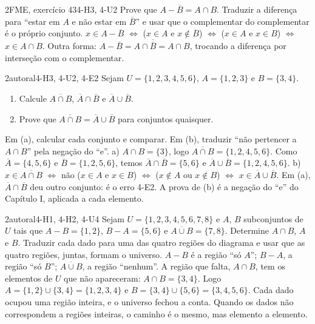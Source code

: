\begin{exemplo}{}{2}{FME, exercício 43}{4-H3, 4-U2}
\label{ex:u4:fme43}
Prove que $A-\overline{B}=A\cap B$.
\plano Traduzir a diferença para \enquote{estar em $A$ e não estar em $\overline{B}$} e usar que o complementar do complementar é o próprio conjunto.
\resolucao $x\in A-\overline{B}$ $\iff$ ($x\in A$ e $x\notin\overline{B}$) $\iff$ ($x\in A$ e $x\in B$) $\iff$ $x\in A\cap B$.
\comentario Outra forma: $A-\overline{B}=A\cap\overline{\overline{B}}=A\cap B$, trocando a diferença por interseção com o complementar.
\end{exemplo}

\begin{exemplo}{}{2}{autoral}{4-H3, 4-U2, 4-E2}
\label{ex:u4:demorgan}
Sejam $U=\{1,2,3,4,5,6\}$, $A=\{1,2,3\}$ e $B=\{3,4\}$.
\begin{enumerate}[label=\alph*)]
  \item Calcule $\overline{A\cap B}$, $\overline{A}\cap\overline{B}$ e $\overline{A}\cup\overline{B}$.
  \item Prove que $\overline{A\cap B}=\overline{A}\cup\overline{B}$ para conjuntos quaisquer.
\end{enumerate}
\plano Em (a), calcular cada conjunto e comparar. Em (b), traduzir \enquote{não pertencer a $A\cap B$} pela negação do \enquote{e}.
\resolucao a) $A\cap B=\{3\}$, logo $\overline{A\cap B}=\{1,2,4,5,6\}$. Como $\overline{A}=\{4,5,6\}$ e $\overline{B}=\{1,2,5,6\}$, temos $\overline{A}\cap\overline{B}=\{5,6\}$ e $\overline{A}\cup\overline{B}=\{1,2,4,5,6\}$. b) $x\in\overline{A\cap B}$ $\iff$ não ($x\in A$ e $x\in B$) $\iff$ ($x\notin A$ ou $x\notin B$) $\iff$ $x\in\overline{A}\cup\overline{B}$.
\comentario Em (a), $\overline{A}\cap\overline{B}$ deu outro conjunto: é o erro 4-E2. A prova de (b) é a negação do \enquote{e} do Capítulo I, aplicada a cada elemento.
\end{exemplo}

\begin{exemplo}{}{2}{autoral}{4-H1, 4-H2, 4-U4}
\label{ex:u4:regioes}
Sejam $U=\{1,2,3,4,5,6,7,8\}$ e $A$, $B$ subconjuntos de $U$ tais que $A-B=\{1,2\}$, $B-A=\{5,6\}$ e $\overline{A\cup B}=\{7,8\}$. Determine $A\cap B$, $A$ e $B$.
\plano Traduzir cada dado para uma das quatro regiões do diagrama e usar que as quatro regiões, juntas, formam o universo.
\resolucao $A-B$ é a região \enquote{só $A$}; $B-A$, a região \enquote{só $B$}; $\overline{A\cup B}$, a região \enquote{nenhum}. A região que falta, $A\cap B$, tem os elementos de $U$ que não apareceram: $A\cap B=\{3,4\}$. Logo $A=\{1,2\}\cup\{3,4\}=\{1,2,3,4\}$ e $B=\{3,4\}\cup\{5,6\}=\{3,4,5,6\}$.
\comentario Cada dado ocupou uma região inteira, e o universo fechou a conta. Quando os dados não correspondem a regiões inteiras, o caminho é o mesmo, mas elemento a elemento.
\end{exemplo}

